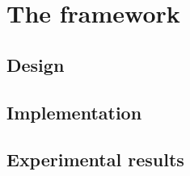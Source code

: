 \chapter{The framework}
\section{Design}
\todo
\section{Implementation}
\todo
\section{Experimental results}
\todo
